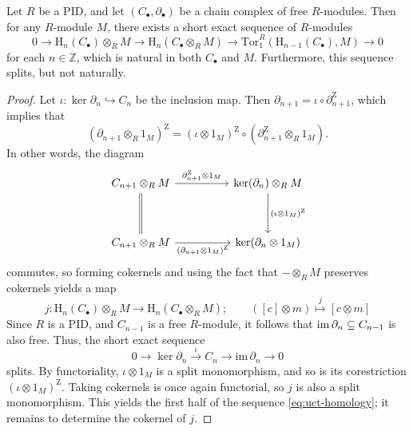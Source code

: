 \begin{theorem}
    Let $R$ be a PID, and let $(C_\bullet, \partial_\bullet)$ be a chain complex of free $R$-modules. Then for any $R$-module $M$, there exists a short exact sequence of $R$-modules 
    \begin{equation*}\label{eq:uct-homology}
        0 \to \mathrm{H}_n(C_\bullet) \otimes_R M \to \mathrm{H}_n(C_\bullet \otimes_R M) \to \mathrm{Tor}_1^R(\mathrm{H}_{n-1}(C_\bullet), M) \to 0 \tag{$\star$}
    \end{equation*}
    for each $n \in \mathbb{Z}$, which is natural in both $C_\bullet$ and $M$. Furthermore, this sequence splits, but not naturally.
\end{theorem}

\begin{proof}
Let $\iota \colon \ker \partial_n \hookrightarrow C_n$ be the inclusion map. Then $\partial_{n+1} = \iota \circ \partial_{n+1}^{\mathrm{Z}}$, which implies that 
\begin{equation*}
(\partial_{n+1} \otimes_R 1_M)^\mathrm{Z} = (\iota \otimes 1_M)^{\mathrm{Z}} \circ (\partial^{\mathrm{Z}}_{n+1} \otimes_R 1_M).
\end{equation*}
In other words, the diagram
\begin{equation*}
  \begin{tikzcd}
	{C_{n+1} \otimes_R M} && {\ker(\partial_n) \otimes_R M} \\
	\\
	{C_{n+1} \otimes_R M} && {\ker(\partial_n \otimes1_M)}
	\arrow["{\partial_{n+1}^{\mathrm{Z}} \otimes1_M}", from=1-1, to=1-3]
	\arrow[equals, from=1-1, to=3-1]
	\arrow["{(\iota \otimes 1_M)^{\mathrm{Z}}}", from=1-3, to=3-3]
	\arrow["{(\partial_{n+1}\otimes1_M)^{\mathrm{Z}}}"', from=3-1, to=3-3]
\end{tikzcd}
\end{equation*}
commutes, so forming cokernels and using the fact that $- \otimes_R M$ preserves cokernels yields a map
\begin{equation*}
    j \colon \mathrm{H}_n(C_\bullet) \otimes_R M \to \mathrm{H}_n(C_\bullet \otimes_R M); \quad \quad ([c] \otimes m) \overset{j}{\longmapsto} [c \otimes m]
\end{equation*}
Since $R$ is a PID, and $C_{n-1}$ is a free $R$-module, it follows that $\operatorname{im} \partial_n \subseteq C_{n-1}$ is also free. Thus, the short exact sequence
\begin{equation*}
    0 \to \ker \partial_n \xrightarrow{\iota} C_n \to \mathrm{im}\, \partial_n \to 0
\end{equation*}
splits. By functoriality, $\iota \otimes 1_M$ is a split monomorphism, and so is its corestriction $(\iota \otimes 1_M)^{\mathrm{Z}}$. Taking cokernels is once again functorial, so $j$ is also a split monomorphism. This yields the first half of the sequence \eqref{eq:uct-homology}; it remains to determine the cokernel of $j$.


\end{proof}
